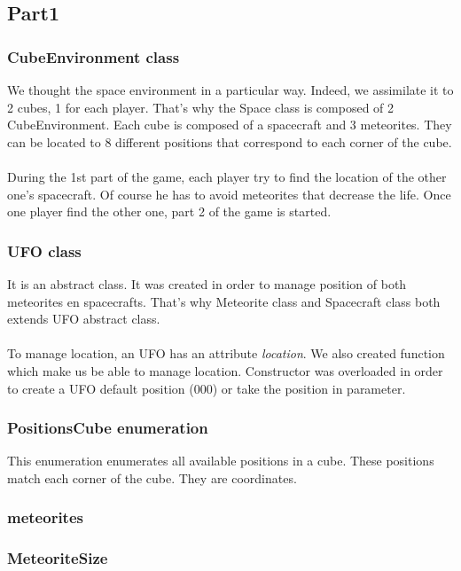 \subsection{Part1}

\subsubsection{CubeEnvironment class}

We thought the space environment in a particular way. 
Indeed, we assimilate it to 2 cubes, 1 for each player. That's why the Space class is composed of 2 CubeEnvironment.
Each cube is composed of a spacecraft and 3 meteorites. 
They can be located to 8 different positions that correspond to each corner of the cube.\\
\\
During the 1st part of the game, each player try to find the location of the other one's spacecraft.
Of course he has to avoid meteorites that decrease the life. 
Once one player find the other one, part 2 of the game is started.

\subsubsection{UFO class}

It is an abstract class. 
It was created in order to manage position of both meteorites en spacecrafts.
That's why Meteorite class and Spacecraft class both extends UFO abstract class.\\
\\
To manage location, an UFO has an attribute \textit{location}.
We also created function which make us be able to manage location.
Constructor was overloaded in order to create a UFO default position (000) or take the position in parameter.

\subsubsection{PositionsCube enumeration}

This enumeration enumerates all available positions in a cube. 
These positions match each corner of the cube.
They are coordinates.

\subsubsection{meteorites}

\subsubsection{MeteoriteSize}

